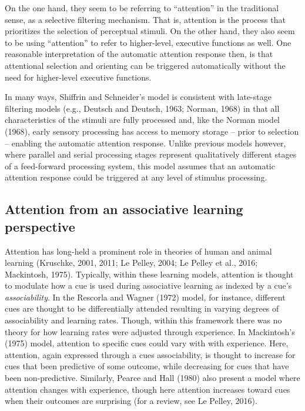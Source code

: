 \documentclass[]{DissertateCUNY}
\begin{document}
On the one hand, they seem to be referring to ``attention'' in the
traditional sense, as a selective filtering mechanism. That is,
attention is the process that prioritizes the selection of perceptual
stimuli. On the other hand, they also seem to be using ``attention'' to
refer to higher-level, executive functions as well. One reasonable
interpretation of the automatic attention response then, is that
attentional selection and orienting can be triggered automatically
without the need for higher-level executive functions.

In many ways, Shiffrin and Schneider's model is consistent with
late-stage filtering models (e.g., Deutsch and Deutsch, 1963; Norman,
1968) in that all characteristics of the stimuli are fully processed
and, like the Norman model (1968), early sensory processing has access
to memory storage -- prior to selection -- enabling the automatic
attention response. Unlike previous models however, where parallel and
serial processing stages represent qualitatively different stages of a
feed-forward processing system, this model assumes that an automatic
attention response could be triggered at any level of stimulus
processing.

\hypertarget{attention-from-an-associative-learning-perspective}{%
\subsection{Attention from an associative learning
perspective}\label{attention-from-an-associative-learning-perspective}}

Attention has long-held a prominent role in theories of human and animal
learning (Kruschke, 2001, 2011; Le Pelley, 2004; Le Pelley et al., 2016;
Mackintosh, 1975). Typically, within these learning models, attention is
thought to modulate how a cue is used during associative learning as
indexed by a cue's \textit{associability}. In the Rescorla and Wagner
(1972) model, for instance, different cues are thought to be
differentially attended resulting in varying degrees of associability
and learning rates. Though, within this framework there was no theory
for how learning rates were adjusted through experience. In Mackintosh's
(1975) model, attention to specific cues could vary with with
experience. Here, attention, again expressed through a cues
associability, is thought to increase for cues that been predictive of
some outcome, while decreasing for cues that have been non-predictive.
Similarly, Pearce and Hall (1980) also present a model where attention
changes with experience, though here attention increases toward cues
when their outcomes are surprising (for a review, see Le Pelley, 2016).
\end{document}
